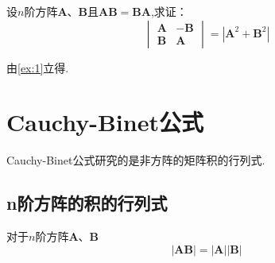 \begin{brown}
    \begin{example}
        设$n$阶方阵$\bm{A}$、$\bm{B}$且$\bm{AB}=\bm{BA}$,求证：
        \[
        \begin{vmatrix}
            \bm{A}&-\bm{B}\\
            \bm{B}&\bm{A}
        \end{vmatrix}=\left|\bm{A}^2+\bm{B}^ 2\right|
        \]
    \end{example}
    \begin{Proof}
    由\cref{ex:1}立得.
    \end{Proof}
\end{brown}
\newpage
\section{Cauchy-Binet公式}
\begin{red}
\begin{remark}
    \textup{Cauchy-Binet}公式研究的是非方阵的矩阵积的行列式.
\end{remark}
\end{red}
\subsection{n阶方阵的积的行列式}
\begin{formal}
\begin{theorem}[方阵积的行列式]
    对于$n$阶方阵$\bm{A}$、$\bm{B}$
    \[
    \left|\bm{AB}\right|
    = 
    \left|\bm{A}\right|
    \left|\bm{B}\right|
    \]
\end{theorem}
\end{formal}

